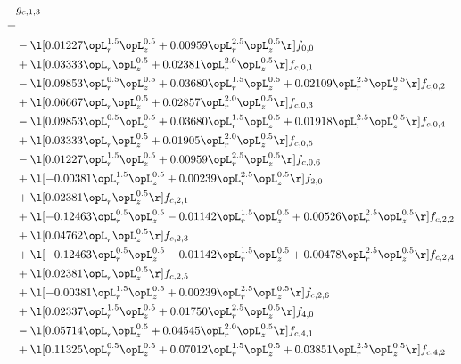 \begin{alignat}{2} 
\label{eq:g_13_0} 
& g_{c,1,3} \nonumber \\ 
 = \\ 
& - \l[  0.01227 \opL_r^{1.5} \opL_z^{0.5} +  0.00959 \opL_r^{2.5} \opL_z^{0.5}  \r] f_{0,0} \nonumber \\ 
& + \l[  0.03333 \opL_r \opL_z^{0.5} +  0.02381 \opL_r^{2.0} \opL_z^{0.5}  \r] f_{c,0,1} \nonumber \\ 
& - \l[  0.09853 \opL_r^{0.5} \opL_z^{0.5} +  0.03680 \opL_r^{1.5} \opL_z^{0.5} +  0.02109 \opL_r^{2.5} \opL_z^{0.5}  \r] f_{c,0,2} \nonumber \\ 
& + \l[  0.06667 \opL_r \opL_z^{0.5} +  0.02857 \opL_r^{2.0} \opL_z^{0.5}  \r] f_{c,0,3} \nonumber \\ 
& - \l[  0.09853 \opL_r^{0.5} \opL_z^{0.5} +  0.03680 \opL_r^{1.5} \opL_z^{0.5} +  0.01918 \opL_r^{2.5} \opL_z^{0.5}  \r] f_{c,0,4} \nonumber \\ 
& + \l[  0.03333 \opL_r \opL_z^{0.5} +  0.01905 \opL_r^{2.0} \opL_z^{0.5}  \r] f_{c,0,5} \nonumber \\ 
& - \l[  0.01227 \opL_r^{1.5} \opL_z^{0.5} +  0.00959 \opL_r^{2.5} \opL_z^{0.5}  \r] f_{c,0,6} \nonumber \\ 
& + \l[  -0.00381 \opL_r^{1.5} \opL_z^{0.5} +  0.00239 \opL_r^{2.5} \opL_z^{0.5}  \r] f_{2,0} \nonumber \\ 
& + \l[  0.02381 \opL_r \opL_z^{0.5}  \r] f_{c,2,1} \nonumber \\ 
& + \l[  -0.12463 \opL_r^{0.5} \opL_z^{0.5}   -0.01142 \opL_r^{1.5} \opL_z^{0.5} +  0.00526 \opL_r^{2.5} \opL_z^{0.5}  \r] f_{c,2,2} \nonumber \\ 
& + \l[  0.04762 \opL_r \opL_z^{0.5}  \r] f_{c,2,3} \nonumber \\ 
& + \l[  -0.12463 \opL_r^{0.5} \opL_z^{0.5}   -0.01142 \opL_r^{1.5} \opL_z^{0.5} +  0.00478 \opL_r^{2.5} \opL_z^{0.5}  \r] f_{c,2,4} \nonumber \\ 
& + \l[  0.02381 \opL_r \opL_z^{0.5}  \r] f_{c,2,5} \nonumber \\ 
& + \l[  -0.00381 \opL_r^{1.5} \opL_z^{0.5} +  0.00239 \opL_r^{2.5} \opL_z^{0.5}  \r] f_{c,2,6} \nonumber \\ 
& + \l[  0.02337 \opL_r^{1.5} \opL_z^{0.5} +  0.01750 \opL_r^{2.5} \opL_z^{0.5}  \r] f_{4,0} \nonumber \\ 
& - \l[  0.05714 \opL_r \opL_z^{0.5} +  0.04545 \opL_r^{2.0} \opL_z^{0.5}  \r] f_{c,4,1} \nonumber \\ 
& + \l[  0.11325 \opL_r^{0.5} \opL_z^{0.5} +  0.07012 \opL_r^{1.5} \opL_z^{0.5} +  0.03851 \opL_r^{2.5} \opL_z^{0.5}  \r] f_{c,4,2} \nonumber \\ 

\end{alignat}
